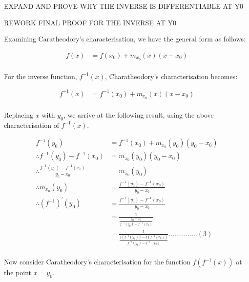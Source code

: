 		\bigbreak

		EXPAND AND PROVE WHY THE INVERSE IS DIFFERENTIABLE AT Y0 

		\bigbreak

		REWORK FINAL PROOF FOR THE INVERSE AT Y0

		\bigbreak

		Examining Caratheodory's characterisation, we have the general form as follows:

		\begin{align*}
		f(x) & = f(x_0) + m_{x_0}(x)(x-x_0)\\
		\end{align*}

		For the inverse function, $f^{-1} (x)$, Charatheodory's characterisation becomes:

		\begin{align*}
		f^{-1} (x) & = f^{-1} (x_0) + m_{x_0}(x)(x-x_0)\\
		\end{align*}

		Replacing $x$ with $y_0$, we arrive at the following result, using the above characterisation of $f^{-1}(x)$.

		\begin{align*}
		f^{-1} (y_0) & = f^{-1} (x_0) + m_{x_0}(y_0)(y_0-x_0)\\
		\therefore f^{-1} (y_0) - f^{-1} (x_0) & = m_{x_0}(y_0)(y_0-x_0)\\
		\therefore \frac{f^{-1} (y_0) - f^{-1} (x_0)}{y_0-x_0} & = m_{x_0}(y_0)\\
		\therefore m_{x_0}(y_0) & = \frac{f^{-1} (y_0) - f^{-1} (x_0)}{y_0-x_0}\\
		\therefore (f^{-1})^\prime(y_0) & = \frac{f^{-1} (y_0) - f^{-1} (x_0)}{y_0-x_0}\\
		& = \frac{1}{\frac{y_0-x_0}{f^{-1} (y_0) - f^{-1} (x_0)}}\\
		& = \frac{1}{\frac{f(f^{-1}(y_0))-f(f^{-1}(x_0))}{f^{-1} (y_0) - f^{-1} (x_0)}} \dots\dots\dots\dots\dots(3)\\
		\end{align*}

		Now consider Caratheodory's characterisation for the function $f(f^{-1}(x))$ at the point $x = y_0$.


